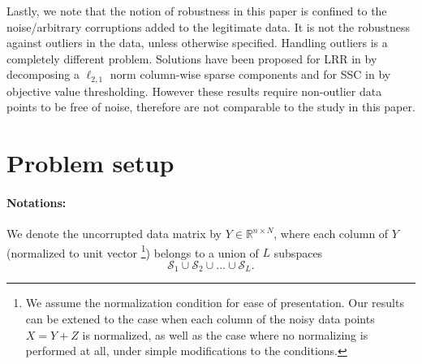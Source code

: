 \documentclass[twoside,11pt]{article}
\numberwithin{equation}{section}
\begin{document}





Lastly, we note that the notion of robustness in this paper is confined to the noise/arbitrary corruptions added to the legitimate data. It is not the robustness against outliers in the data, unless otherwise specified. Handling outliers is a completely different problem. Solutions have been proposed for LRR in \citet{liu2012aistats} by decomposing a $\ell_{2,1}$ norm column-wise sparse components and for SSC in \citet{soltanolkotabi2011geometric} by objective value thresholding. However these results require non-outlier data points to be free of noise, therefore are not comparable to the study in this paper.


\section{Problem setup}\label{sec:prob_setup}
\paragraph{Notations: }
We denote the uncorrupted data matrix by $Y \in \mathbb{R}^{n\times N}$, where each column of $Y$ (normalized to unit vector \footnote{We assume the normalization condition for ease of presentation. Our results can be extened to the case when   each column of the noisy data points $X=Y+Z$ is normalized, as well as the case where no normalizing is performed at all, under simple modifications to the conditions.   }) belongs to a union of $L$ subspaces $$\mathcal{S}_1 \cup \mathcal{S}_2 \cup...\cup \mathcal{S}_L.$$
\end{document}
